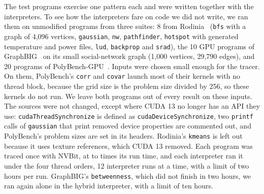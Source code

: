 \documentclass[11pt]{article}
\newcommand{\code}[1]{\texttt{#1}}
\begin{document}
The test programs exercise one pattern each and were written together with the interpreters. To see how the
interpreters fare on code we did not write, we ran them on \numBenchTotal{} unmodified programs from three suites:
8 from Rodinia~\cite{Che2009Rodinia} (\code{bfs} with a graph of 4{,}096 vertices, \code{gaussian}, \code{nw},
\code{pathfinder}, \code{hotspot} with generated temperature and power files, \code{lud}, \code{backprop} and
\code{srad}), the 10 GPU programs of GraphBIG~\cite{Nai2015GraphBIG} on its small social-network graph (1{,}000
vertices, 29{,}790 edges), and 20 programs of PolyBench-GPU~\cite{Grauer2012PolyBenchGPU}. Inputs were chosen small
enough for the tracer. On them, PolyBench's \code{corr} and \code{covar} launch most of their kernels with no thread
block, because the grid size is the problem size divided by 256, so these kernels do not run. We leave both programs
out of every result on these inputs. The sources were not changed, except where CUDA 13 no longer has an API they use:
\code{cudaThreadSynchronize} is defined as \code{cudaDeviceSynchronize}, two \code{printf} calls of
\code{gaussian} that print removed device properties are commented out, and PolyBench's problem sizes are set in its
headers. Rodinia's \code{kmeans} is left out because it uses texture references, which CUDA 13 removed. Each program
was traced once with NVBit, at \numBenchNvbitLo{} to \numBenchNvbitHi{} times its run time, and each interpreter ran
it under the four thread orders, 12 interpreter runs at a time, with a limit of two hours per run. GraphBIG's
\code{betweenness}, which did not finish in two hours, we ran again alone in the hybrid interpreter, with a limit of
ten hours.

\begin{table}[tbp]
\centering
\footnotesize
\setlength{\tabcolsep}{4pt}

\caption{The interpreters against one traced run of each benchmark, summed per suite: the GPU's dependences, the
interpreter's certain and possible dependences split by whether the run has them, and the run's dependences the
interpreter does not report (false negatives). GraphBIG's \code{betweenness} timed out in the whole-program
interpreter and is not included in its rows.}
\label{tab:bench-summary}
\end{table}
\end{document}

